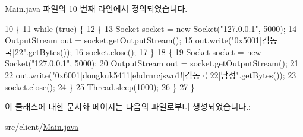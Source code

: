 Main.\-java 파일의 10 번째 라인에서 정의되었습니다.


\begin{DoxyCode}
10                                                                                                           \{
11         \textcolor{keywordflow}{while} (\textcolor{keyword}{true}) \{
12             \{
13                 Socket socket = \textcolor{keyword}{new} Socket(\textcolor{stringliteral}{"127.0.0.1"}, 5000);
14                 OutputStream out = socket.getOutputStream();
15                 out.write(\textcolor{stringliteral}{"0x5001|김동국|22"}.getBytes());
16                 socket.close();
17             \}
18             \{
19                 Socket socket = \textcolor{keyword}{new} Socket(\textcolor{stringliteral}{"127.0.0.1"}, 5000);
20                 OutputStream out = socket.getOutputStream();
21 
22                 out.write(\textcolor{stringliteral}{"0x6001|dongkuk5411|ehdrnrcjswo1!|김동국|22|남성"}.getBytes());
23                 socket.close();
24             \}
25             Thread.sleep(1000);
26         \}
27     \}
\end{DoxyCode}


이 클래스에 대한 문서화 페이지는 다음의 파일로부터 생성되었습니다.\-:\begin{DoxyCompactItemize}
\item 
src/client/\hyperlink{_main_8java}{Main.\-java}\end{DoxyCompactItemize}
